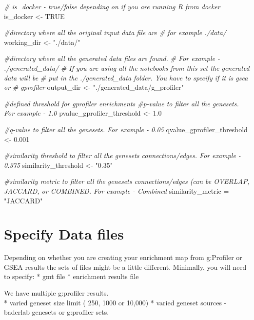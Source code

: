 \documentclass[
]{book}
\newenvironment{Shaded}{\begin{snugshade}}{\end{snugshade}}
\newcommand{\CommentTok}[1]{\textcolor[rgb]{0.56,0.35,0.01}{\textit{#1}}}
\newcommand{\ConstantTok}[1]{\textcolor[rgb]{0.00,0.00,0.00}{#1}}
\newcommand{\FloatTok}[1]{\textcolor[rgb]{0.00,0.00,0.81}{#1}}
\newcommand{\NormalTok}[1]{#1}
\newcommand{\OtherTok}[1]{\textcolor[rgb]{0.56,0.35,0.01}{#1}}
\newcommand{\StringTok}[1]{\textcolor[rgb]{0.31,0.60,0.02}{#1}}
\begin{document}
\begin{Shaded}
\begin{Highlighting}[]
\CommentTok{\# is\_docker {-} true/false depending on if you are running R from docker}
\NormalTok{is\_docker }\OtherTok{\textless{}{-}} \ConstantTok{TRUE}

\CommentTok{\#directory where all the original input data file are}
\CommentTok{\# for example ./data/}
\NormalTok{working\_dir }\OtherTok{\textless{}{-}} \StringTok{"./data/"}


\CommentTok{\#directory where all the generated data files are found.}
\CommentTok{\# For example {-} ./generated\_data/}
\CommentTok{\# If you are using all the notebooks from this set the generated data will be}
\CommentTok{\# put in the ./generated\_data folder.  You have to specify if it is gsea or }
\CommentTok{\# gprofiler}
\NormalTok{output\_dir }\OtherTok{\textless{}{-}} \StringTok{"./generated\_data/g\_profiler"}


\CommentTok{\#defined threshold for gprofiler enrichments }
\CommentTok{\#p{-}value to filter all the genesets.  For example {-}   1.0}
\NormalTok{pvalue\_gprofiler\_threshold }\OtherTok{\textless{}{-}} \FloatTok{1.0}

\CommentTok{\#q{-}value to filter all the genesets.  For example {-}   0.05}
\NormalTok{qvalue\_gprofiler\_threshold }\OtherTok{\textless{}{-}} \FloatTok{0.001}

\CommentTok{\#similarity threshold to filter all the genesets connections/edges.  For example {-}   0.375}
\NormalTok{similarity\_threshold }\OtherTok{\textless{}{-}} \StringTok{"0.35"}

\CommentTok{\#similarity metric to filter all the genesets connections/edges (can be OVERLAP, JACCARD, or COMBINED.   For example {-}   Combined}
\NormalTok{similarity\_metric }\OtherTok{=} \StringTok{"JACCARD"}
\end{Highlighting}
\end{Shaded}

\hypertarget{specify-data-files}{%
\section{Specify Data files}\label{specify-data-files}}

Depending on whether you are creating your enrichment map from g:Profiler or GSEA results the sets of files might be a little different. Minimally, you will need to specify:
* gmt file
* enrichment results file

We have multiple g:profiler results.\\
* varied geneset size limit ( 250, 1000 or 10,000)
* varied geneset sources - baderlab genesets or g:profiler sets.
\end{document}
